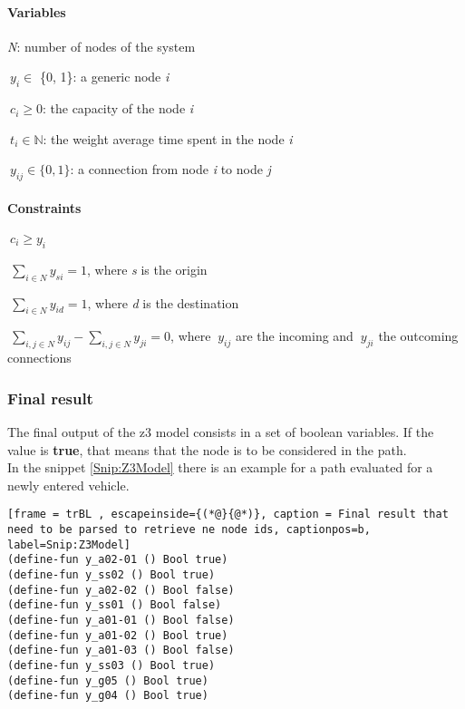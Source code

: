 \paragraph{Variables}
\begin{description}
	\item \textit{N}: number of nodes of the system
	\item $\ y_{i} \in$ \{0, 1\}: a generic node \textit{i}
	\item $\ c_{i} \geq 0$: the capacity of the node \textit{i}
	\item $\ t_{i} \in \mathbb{N}$: the weight average time spent in the node \textit{i}
	\item $\ y_{ij} \in \{0, 1\}$: a connection from node \textit{i} to node \textit{j}
\end{description}

\paragraph{Constraints}
\begin{description}
	\item $\ c_{i} \geq y_{i} $
	\item $\ \sum_{i \in N} y_{si} = 1$, where \textit{s} is the origin
	\item $\ \sum_{i \in N} y_{id} = 1$, where \textit{d} is the destination
	\item $\ \sum_{i,j \in N} y_{ij} - \sum_{i,j \in N} y_{ji} = 0$, where $\ y_{ij}$ are the incoming and $\ y_{ji}$ the outcoming connections
\end{description}

\subsubsection{Final result}
The final output of the z3 model consists in a set of boolean variables. If the value is \textbf{true}, that means that the node is to be considered in the path.\\
In the snippet \ref{Snip:Z3Model} there is an example for a path evaluated for a newly entered vehicle.
\begin{lstlisting}[frame = trBL , escapeinside={(*@}{@*)}, caption = Final result that need to be parsed to retrieve ne node ids, captionpos=b, label=Snip:Z3Model]
(define-fun y_a02-01 () Bool true)
(define-fun y_ss02 () Bool true)
(define-fun y_a02-02 () Bool false)
(define-fun y_ss01 () Bool false)
(define-fun y_a01-01 () Bool false)
(define-fun y_a01-02 () Bool true)
(define-fun y_a01-03 () Bool false)
(define-fun y_ss03 () Bool true)
(define-fun y_g05 () Bool true)
(define-fun y_g04 () Bool true)
\end{lstlisting}

